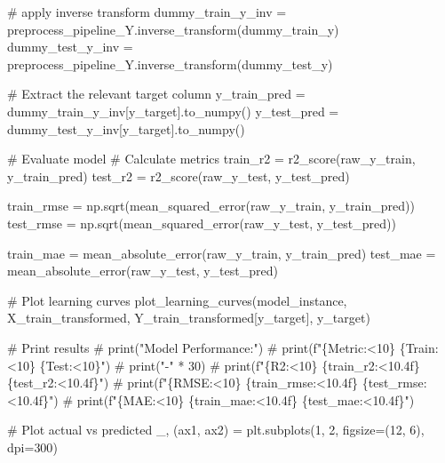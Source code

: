 \documentclass[
  letterpaper,
  DIV=11,
  numbers=noendperiod]{scrartcl}
\newenvironment{Shaded}{\begin{snugshade}}{\end{snugshade}}
\newcommand{\CommentTok}[1]{\textcolor[rgb]{0.37,0.37,0.37}{#1}}
\newcommand{\DecValTok}[1]{\textcolor[rgb]{0.68,0.00,0.00}{#1}}
\newcommand{\NormalTok}[1]{\textcolor[rgb]{0.00,0.23,0.31}{#1}}
\newcommand{\OperatorTok}[1]{\textcolor[rgb]{0.37,0.37,0.37}{#1}}
\begin{document}
\begin{Shaded}
\begin{Highlighting}[]
    \CommentTok{\# apply inverse transform}
\NormalTok{    dummy\_train\_y\_inv }\OperatorTok{=}\NormalTok{ preprocess\_pipeline\_Y.inverse\_transform(dummy\_train\_y)}
\NormalTok{    dummy\_test\_y\_inv }\OperatorTok{=}\NormalTok{ preprocess\_pipeline\_Y.inverse\_transform(dummy\_test\_y)}

    \CommentTok{\# Extract the relevant target column}
\NormalTok{    y\_train\_pred }\OperatorTok{=}\NormalTok{ dummy\_train\_y\_inv[y\_target].to\_numpy()}
\NormalTok{    y\_test\_pred }\OperatorTok{=}\NormalTok{ dummy\_test\_y\_inv[y\_target].to\_numpy()}

    \CommentTok{\# Evaluate model}
    \CommentTok{\# Calculate metrics}
\NormalTok{    train\_r2 }\OperatorTok{=}\NormalTok{ r2\_score(raw\_y\_train, y\_train\_pred)}
\NormalTok{    test\_r2 }\OperatorTok{=}\NormalTok{ r2\_score(raw\_y\_test, y\_test\_pred)}

\NormalTok{    train\_rmse }\OperatorTok{=}\NormalTok{ np.sqrt(mean\_squared\_error(raw\_y\_train, y\_train\_pred))}
\NormalTok{    test\_rmse }\OperatorTok{=}\NormalTok{ np.sqrt(mean\_squared\_error(raw\_y\_test, y\_test\_pred))}

\NormalTok{    train\_mae }\OperatorTok{=}\NormalTok{ mean\_absolute\_error(raw\_y\_train, y\_train\_pred)}
\NormalTok{    test\_mae }\OperatorTok{=}\NormalTok{ mean\_absolute\_error(raw\_y\_test, y\_test\_pred)}

    \CommentTok{\# Plot learning curves}
\NormalTok{    plot\_learning\_curves(model\_instance, X\_train\_transformed, Y\_train\_transformed[y\_target], y\_target)}

    \CommentTok{\# Print results}
    \CommentTok{\# print("Model Performance:")}
    \CommentTok{\# print(f"\{\textquotesingle{}Metric\textquotesingle{}:\textless{}10\} \{\textquotesingle{}Train\textquotesingle{}:\textless{}10\} \{\textquotesingle{}Test\textquotesingle{}:\textless{}10\}")}
    \CommentTok{\# print("{-}" * 30)}
    \CommentTok{\# print(f"\{\textquotesingle{}R2\textquotesingle{}:\textless{}10\} \{train\_r2:\textless{}10.4f\} \{test\_r2:\textless{}10.4f\}")}
    \CommentTok{\# print(f"\{\textquotesingle{}RMSE\textquotesingle{}:\textless{}10\} \{train\_rmse:\textless{}10.4f\} \{test\_rmse:\textless{}10.4f\}")}
    \CommentTok{\# print(f"\{\textquotesingle{}MAE\textquotesingle{}:\textless{}10\} \{train\_mae:\textless{}10.4f\} \{test\_mae:\textless{}10.4f\}")}

    \CommentTok{\# Plot actual vs predicted}
\NormalTok{    \_, (ax1, ax2) }\OperatorTok{=}\NormalTok{ plt.subplots(}\DecValTok{1}\NormalTok{, }\DecValTok{2}\NormalTok{, figsize}\OperatorTok{=}\NormalTok{(}\DecValTok{12}\NormalTok{, }\DecValTok{6}\NormalTok{), dpi}\OperatorTok{=}\DecValTok{300}\NormalTok{)}


\end{Highlighting}
\end{Shaded}
\end{document}
